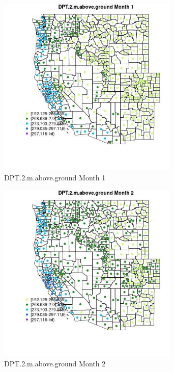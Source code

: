 \begin{figure} 
\centering  
\includegraphics[width=0.77\textwidth]{Code_Outputs/df_report_ML_predictors_CountyCentroid_Locations_Dates_2008-01-01to2018-12-31_MapObsMo1DPT2maboveground.jpg} 
\caption{\label{fig:df_report_ML_predictors_CountyCentroid_Locations_Dates_2008-01-01to2018-12-31MapObsMo1DPT2maboveground}DPT.2.m.above.ground Month 1} 
\end{figure} 
 

\clearpage 

\begin{figure} 
\centering  
\includegraphics[width=0.77\textwidth]{Code_Outputs/df_report_ML_predictors_CountyCentroid_Locations_Dates_2008-01-01to2018-12-31_MapObsMo2DPT2maboveground.jpg} 
\caption{\label{fig:df_report_ML_predictors_CountyCentroid_Locations_Dates_2008-01-01to2018-12-31MapObsMo2DPT2maboveground}DPT.2.m.above.ground Month 2} 
\end{figure} 
 

